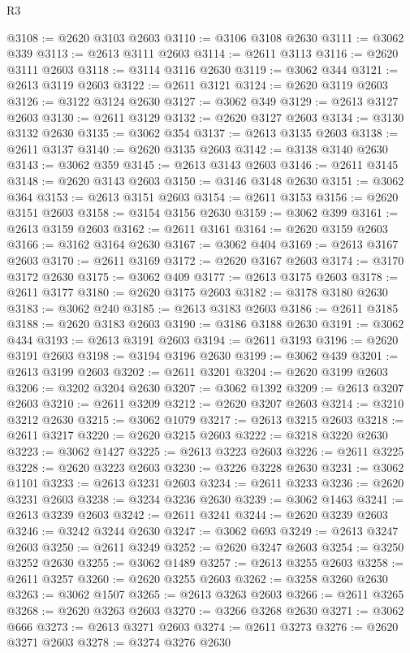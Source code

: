 \begin{lexlean}{R3}
\begin{coremodule}
@3108 := @2620 @3103 @2603
@3110 := @3106 @3108 @2630
@3111 := @3062 @339
@3113 := @2613 @3111 @2603
@3114 := @2611 @3113
@3116 := @2620 @3111 @2603
@3118 := @3114 @3116 @2630
@3119 := @3062 @344
@3121 := @2613 @3119 @2603
@3122 := @2611 @3121
@3124 := @2620 @3119 @2603
@3126 := @3122 @3124 @2630
@3127 := @3062 @349
@3129 := @2613 @3127 @2603
@3130 := @2611 @3129
@3132 := @2620 @3127 @2603
@3134 := @3130 @3132 @2630
@3135 := @3062 @354
@3137 := @2613 @3135 @2603
@3138 := @2611 @3137
@3140 := @2620 @3135 @2603
@3142 := @3138 @3140 @2630
@3143 := @3062 @359
@3145 := @2613 @3143 @2603
@3146 := @2611 @3145
@3148 := @2620 @3143 @2603
@3150 := @3146 @3148 @2630
@3151 := @3062 @364
@3153 := @2613 @3151 @2603
@3154 := @2611 @3153
@3156 := @2620 @3151 @2603
@3158 := @3154 @3156 @2630
@3159 := @3062 @399
@3161 := @2613 @3159 @2603
@3162 := @2611 @3161
@3164 := @2620 @3159 @2603
@3166 := @3162 @3164 @2630
@3167 := @3062 @404
@3169 := @2613 @3167 @2603
@3170 := @2611 @3169
@3172 := @2620 @3167 @2603
@3174 := @3170 @3172 @2630
@3175 := @3062 @409
@3177 := @2613 @3175 @2603
@3178 := @2611 @3177
@3180 := @2620 @3175 @2603
@3182 := @3178 @3180 @2630
@3183 := @3062 @240
@3185 := @2613 @3183 @2603
@3186 := @2611 @3185
@3188 := @2620 @3183 @2603
@3190 := @3186 @3188 @2630
@3191 := @3062 @434
@3193 := @2613 @3191 @2603
@3194 := @2611 @3193
@3196 := @2620 @3191 @2603
@3198 := @3194 @3196 @2630
@3199 := @3062 @439
@3201 := @2613 @3199 @2603
@3202 := @2611 @3201
@3204 := @2620 @3199 @2603
@3206 := @3202 @3204 @2630
@3207 := @3062 @1392
@3209 := @2613 @3207 @2603
@3210 := @2611 @3209
@3212 := @2620 @3207 @2603
@3214 := @3210 @3212 @2630
@3215 := @3062 @1079
@3217 := @2613 @3215 @2603
@3218 := @2611 @3217
@3220 := @2620 @3215 @2603
@3222 := @3218 @3220 @2630
@3223 := @3062 @1427
@3225 := @2613 @3223 @2603
@3226 := @2611 @3225
@3228 := @2620 @3223 @2603
@3230 := @3226 @3228 @2630
@3231 := @3062 @1101
@3233 := @2613 @3231 @2603
@3234 := @2611 @3233
@3236 := @2620 @3231 @2603
@3238 := @3234 @3236 @2630
@3239 := @3062 @1463
@3241 := @2613 @3239 @2603
@3242 := @2611 @3241
@3244 := @2620 @3239 @2603
@3246 := @3242 @3244 @2630
@3247 := @3062 @693
@3249 := @2613 @3247 @2603
@3250 := @2611 @3249
@3252 := @2620 @3247 @2603
@3254 := @3250 @3252 @2630
@3255 := @3062 @1489
@3257 := @2613 @3255 @2603
@3258 := @2611 @3257
@3260 := @2620 @3255 @2603
@3262 := @3258 @3260 @2630
@3263 := @3062 @1507
@3265 := @2613 @3263 @2603
@3266 := @2611 @3265
@3268 := @2620 @3263 @2603
@3270 := @3266 @3268 @2630
@3271 := @3062 @666
@3273 := @2613 @3271 @2603
@3274 := @2611 @3273
@3276 := @2620 @3271 @2603
@3278 := @3274 @3276 @2630

\end{coremodule}
\end{lexlean}
